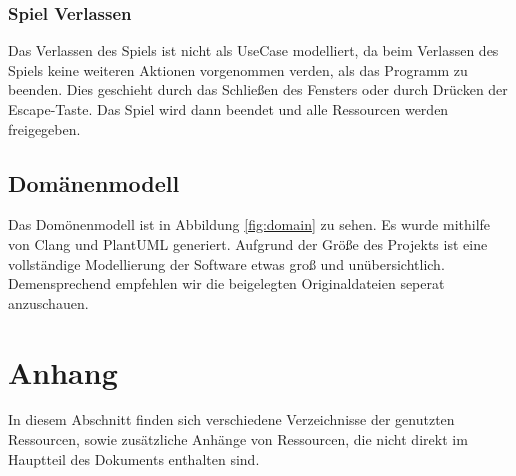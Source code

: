 \documentclass{article}
\newcommand{\listofcode}{
  \doublespacing
  \listof{Code}{Quelltextverzeichnis}
}
\begin{document}
\subsubsection*{Spiel Verlassen}

Das Verlassen des Spiels ist nicht als UseCase modelliert, da beim Verlassen des Spiels keine weiteren Aktionen vorgenommen verden, als das Programm zu beenden. Dies geschieht durch das Schließen des Fensters oder durch Drücken der Escape-Taste. Das Spiel wird dann beendet und alle Ressourcen werden freigegeben.

\subsection{Domänenmodell} \label{subsec:domain}

Das Domönenmodell ist in Abbildung \ref{fig:domain} zu sehen. Es wurde mithilfe von Clang und PlantUML generiert. Aufgrund der Größe des Projekts ist eine vollständige Modellierung der Software etwas groß und unübersichtlich. Demensprechend empfehlen wir die beigelegten Originaldateien seperat anzuschauen.

\newpage

\section{Anhang}

In diesem Abschnitt finden sich verschiedene Verzeichnisse der genutzten 
Ressourcen, sowie zusätzliche Anhänge von Ressourcen, die nicht direkt im 
Hauptteil des Dokuments enthalten sind.

\listoffigures

\end{document}
